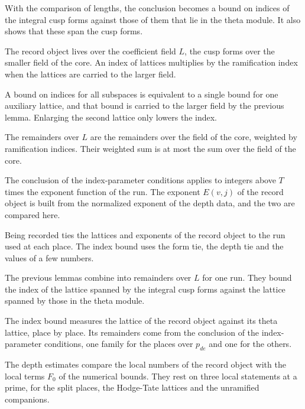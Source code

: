 With the comparison of lengths, the conclusion becomes a bound on indices of the integral cusp forms
against those of them that lie in the theta module. It also shows that these span the cusp forms.

The record object lives over the coefficient field $L$, the cusp forms over the smaller field of the
core. An index of lattices multiplies by the ramification index when the lattices are carried to the
larger field.

A bound on indices for all subspaces is equivalent to a single bound for one auxiliary lattice, and
that bound is carried to the larger field by the previous lemma. Enlarging the second lattice only
lowers the index.

The remainders over $L$ are the remainders over the field of the core, weighted by ramification
indices. Their weighted sum is at most the sum over the field of the core.

The conclusion of the index-parameter conditions applies to integers above $T$ times the exponent
function of the run. The exponent $E(v,j)$ of the record object is built from the normalized exponent
of the depth data, and the two are compared here.

Being recorded ties the lattices and exponents of the record object to the run used at each place.
The index bound uses the form tie, the depth tie and the values of a few numbers.

The previous lemmas combine into remainders over $L$ for one run. They bound the index of the lattice
spanned by the integral cusp forms against the lattice spanned by those in the theta module.

The index bound measures the lattice of the record object against its theta lattice, place by place.
Its remainders come from the conclusion of the index-parameter conditions, one family for the places
over $p_{de}$ and one for the others.

The depth estimates compare the local numbers of the record object with the local terms $F_0$ of the
numerical bounds. They rest on three local statements at a prime, for the split places, the
Hodge-Tate lattices and the unramified companions.

